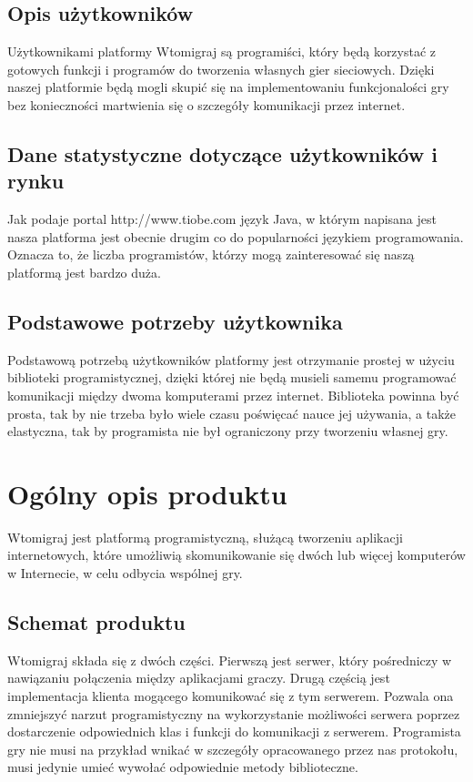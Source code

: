 \documentclass[a4paper, 12pt]{article}
\begin{document}
\subsection[Opis użytkowników]{Opis użytkowników}
Użytkownikami platformy Wtomigraj są programiści, który będą korzystać z gotowych funkcji i programów do tworzenia własnych gier sieciowych. Dzięki naszej platformie będą mogli skupić się na implementowaniu funkcjonalości gry bez konieczności martwienia się o szczegóły komunikacji przez internet. 

\subsection[Dane statystyczne dot. użytkowników i rynku]{Dane statystyczne dotyczące użytkowników i rynku}
Jak podaje portal http://www.tiobe.com język Java, w którym napisana jest nasza platforma jest obecnie drugim co do popularności językiem programowania. Oznacza to, że liczba programistów, którzy mogą zainteresować się naszą platformą jest bardzo duża.

\subsection[Podstawowe potrzeby użytkownika]{Podstawowe potrzeby użytkownika}
Podstawową potrzebą użytkowników platformy jest otrzymanie prostej w użyciu biblioteki programistycznej, dzięki której nie będą musieli samemu programować komunikacji między dwoma komputerami przez internet. Biblioteka powinna być prosta, tak by nie trzeba było wiele czasu poświęcać nauce jej używania, a także elastyczna, tak by programista nie był ograniczony przy tworzeniu własnej gry.

\section[Ogólny opis produktu]{Ogólny opis produktu}
Wtomigraj jest platformą programistyczną, służącą tworzeniu aplikacji internetowych, które umożliwią skomunikowanie się dwóch lub więcej komputerów w Internecie, w celu odbycia wspólnej gry.

\subsection[Schemat produktu]{Schemat produktu}
Wtomigraj składa się z dwóch części. Pierwszą jest serwer, który pośredniczy w nawiązaniu połączenia między aplikacjami graczy. Drugą częścią jest implementacja klienta mogącego komunikować się z tym serwerem. Pozwala ona zmniejszyć narzut programistyczny na wykorzystanie możliwości serwera poprzez dostarczenie odpowiednich klas i funkcji do komunikacji z serwerem. Programista gry nie musi na przykład wnikać w szczegóły opracowanego przez nas protokołu, musi jedynie umieć wywołać odpowiednie metody biblioteczne. 
\end{document}
